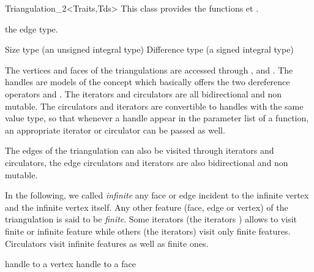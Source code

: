 \begin{ccRefClass}{Triangulation_2<Traits,Tds>}
This class provides the functions  et .

\ccTypes
{}
\ccGlue
{}

\ccGlue
{}
\ccGlue
{}

\ccGlue
{}
\ccGlue
{} {the edge type.}

{Size type (an unsigned integral type)}
\ccGlue
{}
{Difference type (a signed integral type)}

\ccThreeToTwo
The vertices and faces of the triangulations are accessed through 
, 
 and . 
The  handles are models of the concept  which basically
offers the two dereference operators \ccc{*} and \ccc{->}.
The iterators and circulators
are all bidirectional and non mutable.
The circulators and iterators are convertible  to handles with the
same value type, so that whenever a handle appear in the parameter 
list of a function, an appropriate iterator or circulator can be passed
as well.

The edges of the triangulation can also be visited through iterators
and circulators,
the edge circulators and iterators
are also bidirectional and non mutable.

In the following, we called {\it infinite} any face or edge 
incident  to the infinite vertex and the infinite vertex itself.
 Any other feature (face, edge or vertex) of the triangulation is said 
to be {\it finite}.
Some iterators (the  iterators ) allows to visit finite or 
infinite feature while others (the  iterators) visit only
finite features. Circulators visit infinite features as well as finite 
ones.

{handle to a vertex}
\ccGlue
{}
{handle to a face}



\end{ccRefClass}
